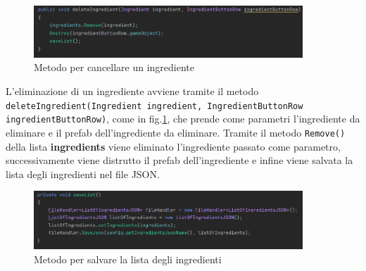 \begin{figure}[H]
    \centering
    \includegraphics[width=0.9\textwidth,height=\textheight,keepaspectratio]{figures/chapter_1/deleteIngredient_CODICE.png}
    \caption{Metodo per cancellare un ingrediente}
    \label{fig:deleteIngredient}
\end{figure}
L'eliminazione di un ingrediente avviene tramite il metodo \texttt{deleteIngredient(Ingredient ingredient, IngredientButtonRow ingredientButtonRow)}, come in fig.\ref{fig:deleteIngredient}, che prende come parametri l'ingrediente da eliminare e il prefab dell'ingrediente da eliminare. Tramite il metodo \texttt{Remove()} della lista \textbf{ingredients} viene eliminato l'ingrediente passato come parametro, successivamente viene distrutto il prefab dell'ingrediente e infine viene salvata la lista degli ingredienti nel file JSON.

\begin{figure}[H]
    \centering
    \includegraphics[width=0.9\textwidth,height=\textheight,keepaspectratio]{figures/chapter_1/saveList_LISTA_CODICE.png}
    \caption{Metodo per salvare la lista degli ingredienti}
    \label{fig:saveListScrollList}
\end{figure}


